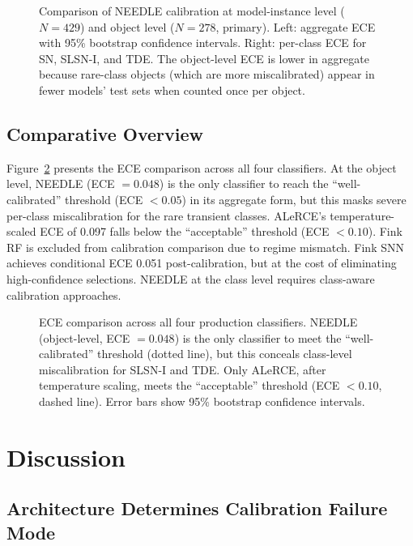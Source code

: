\documentclass[twocolumn]{aastex631}
\begin{document}
\begin{figure}
\caption{Comparison of NEEDLE calibration at model-instance level ($N = 429$) and object level ($N = 278$, primary). Left: aggregate ECE with 95\% bootstrap confidence intervals. Right: per-class ECE for SN, SLSN-I, and TDE. The object-level ECE is lower in aggregate because rare-class objects (which are more miscalibrated) appear in fewer models' test sets when counted once per object. \label{fig:needle_comparison}}
\end{figure}

\subsection{Comparative Overview}

Figure~\ref{fig:summary} presents the ECE comparison across all four classifiers. At the object level, NEEDLE (ECE $= 0.048$) is the only classifier to reach the ``well-calibrated'' threshold (ECE $< 0.05$) in its aggregate form, but this masks severe per-class miscalibration for the rare transient classes. ALeRCE's temperature-scaled ECE of 0.097 falls below the ``acceptable'' threshold (ECE $< 0.10$). Fink RF is excluded from calibration comparison due to regime mismatch. Fink SNN achieves conditional ECE 0.051 post-calibration, but at the cost of eliminating high-confidence selections. NEEDLE at the class level requires class-aware calibration approaches.

\begin{figure}
\caption{ECE comparison across all four production classifiers. NEEDLE (object-level, ECE $= 0.048$) is the only classifier to meet the ``well-calibrated'' threshold (dotted line), but this conceals class-level miscalibration for SLSN-I and TDE. Only ALeRCE, after temperature scaling, meets the ``acceptable'' threshold (ECE $< 0.10$, dashed line). Error bars show 95\% bootstrap confidence intervals. \label{fig:summary}}
\end{figure}


\section{Discussion} \label{sec:discussion}

\subsection{Architecture Determines Calibration Failure Mode}
\end{document}
